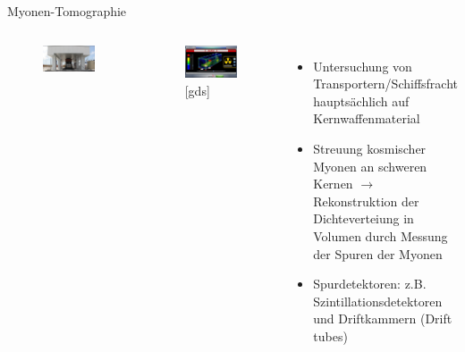\begin{frame}{Myonen-Tomographie}
\begin{columns}[T]
			\begin{figure}[htbp]
			  \centering
			  \includegraphics[width=0.8\columnwidth]{bilder/beispiele/muoncargo}
			\end{figure}
			\vspace{-0.3cm}
				\begin{figure}[htbp]
			  \centering
			  \includegraphics[width=.8\columnwidth]{bilder/beispiele/muondetected}
			  \caption{[gds]}
			\end{figure}
		\hspace{1cm}
		
		\begin{itemize}
		  \item Untersuchung von Transportern/Schiffsfracht hauptsächlich auf Kernwaffenmaterial
		  \item Streuung kosmischer Myonen an schweren Kernen $\rightarrow$ Rekonstruktion der
		  Dichteverteiung in Volumen durch Messung der Spuren der Myonen
		  \item Spurdetektoren: z.B. Szintillationsdetektoren und Driftkammern (Drift tubes)
		\end{itemize}
    \end{columns}
\end{frame}